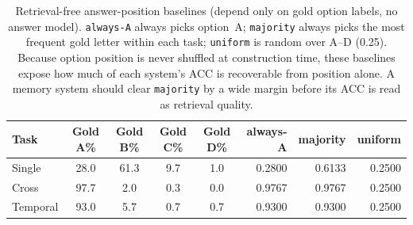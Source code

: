 \begin{table}[t]
\centering
\scriptsize
\caption{Retrieval-free answer-position baselines (depend only on gold option labels, no answer model). \texttt{always-A} always picks option~A; \texttt{majority} always picks the most frequent gold letter within each task; \texttt{uniform} is random over A--D (0.25). Because option position is never shuffled at construction time, these baselines expose how much of each system's ACC is recoverable from position alone. A memory system should clear \texttt{majority} by a wide margin before its ACC is read as retrieval quality.}
\label{tab:option-position-baselines}
\setlength{\tabcolsep}{4pt}
\begin{tabular}{lccccrrr}
\toprule
Task & Gold A\% & Gold B\% & Gold C\% & Gold D\% & always-A & majority & uniform \\
\midrule
Single & 28.0 & 61.3 & 9.7 & 1.0 & 0.2800 & 0.6133 & 0.2500 \\
Cross & 97.7 & 2.0 & 0.3 & 0.0 & 0.9767 & 0.9767 & 0.2500 \\
Temporal & 93.0 & 5.7 & 0.7 & 0.7 & 0.9300 & 0.9300 & 0.2500 \\
\bottomrule
\end{tabular}
\end{table}
